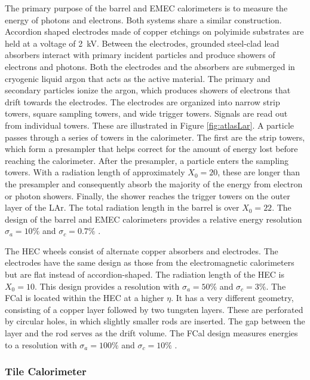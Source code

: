 The primary purpose of the barrel and EMEC calorimeters is to measure the energy of photons and electrons.
Both systems share a similar construction.
Accordion shaped electrodes made of copper etchings on polyimide substrates are held at a voltage of 2~kV.
Between the electrodes, grounded steel-clad lead absorbers interact with primary incident particles and produce showers of electrons and photons.
Both the electrodes and the absorbers are submerged in cryogenic liquid argon that acts as the active material.
The primary and secondary particles ionize the argon, which produces showers of electrons that drift towards the electrodes.
The electrodes are organized into narrow strip towers, square sampling towers, and wide trigger towers.
Signals are read out from individual towers.
These are illustrated in Figure \ref{fig:atlasLar}.
A particle passes through a series of towers in the calorimeter.
The first are the strip towers, which form a presampler that helps correct for the amount of energy lost before reaching the calorimeter.
After the presampler, a particle enters the sampling towers.
With a radiation length of approximately $X_0=20$, these are longer than the presampler and consequently absorb the majority of the energy from electron or photon showers.
Finally, the shower reaches the trigger towers on the outer layer of the LAr.
The total radiation length in the barrel is over $X_0=22$.
The design of the barrel and EMEC calorimeters provides a relative energy resolution $\sigma_a=10\%$ and $\sigma_c=0.7\%$  \cite{lar}.

The HEC wheels consist of alternate copper absorbers and electrodes.
The electrodes have the same design as those from the electromagnetic calorimeters but are flat instead of accordion-shaped.
The radiation length of the HEC is $X_0=10$.
This design provides a resolution with $\sigma_a=50\%$ and $\sigma_c=3\%$.
The FCal is located within the HEC at a higher $\eta$.
It has a very different geometry, consisting of a copper layer followed by two tungsten layers.
These are perforated by circular holes, in which slightly smaller rods are inserted.
The gap between the layer and the rod serves as the drift volume.
The FCal design measures energies to a resolution with $\sigma_a=100\%$ and $\sigma_c=10\%$  \cite{lar}.

\subsubsection{Tile Calorimeter}

